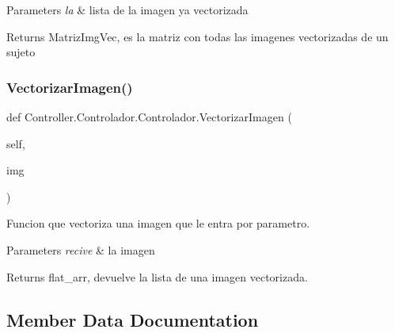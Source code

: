 \begin{DoxyParams}{Parameters}
{\em la} & lista de la imagen ya vectorizada \\
\hline
\end{DoxyParams}
\begin{DoxyReturn}{Returns}
Matriz\+Img\+Vec, es la matriz con todas las imagenes vectorizadas de un sujeto 
\end{DoxyReturn}
\mbox{\label{class_controller_1_1_controlador_1_1_controlador_a4bbeb1232cf73c6c9113e7ffda714b63}} 
\subsubsection{\texorpdfstring{Vectorizar\+Imagen()}{VectorizarImagen()}}
{\footnotesize\ttfamily def Controller.\+Controlador.\+Controlador.\+Vectorizar\+Imagen (\begin{DoxyParamCaption}\item[{}]{self,  }\item[{}]{img }\end{DoxyParamCaption})}



Funcion que vectoriza una imagen que le entra por parametro. 


\begin{DoxyParams}{Parameters}
{\em recive} & la imagen \\
\hline
\end{DoxyParams}
\begin{DoxyReturn}{Returns}
flat\+\_\+arr, devuelve la lista de una imagen vectorizada. 
\end{DoxyReturn}


\subsection{Member Data Documentation}
\mbox{\label{class_controller_1_1_controlador_1_1_controlador_ac7f14b4e1c0f2bf39ef0ddf2ae687898}} 
